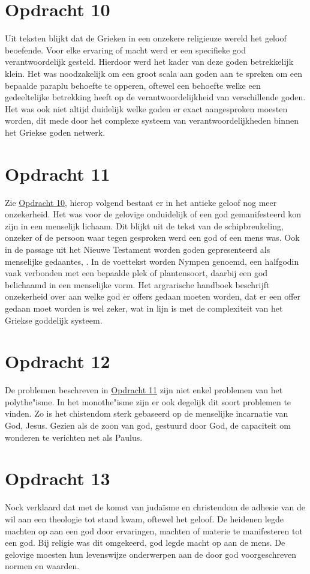 \documentclass[10pt]{amsart}
\begin{document}
\section*{Opdracht 10}
\label{opdracht10}
Uit teksten blijkt dat de Grieken in een onzekere religieuze wereld het geloof beoefende. Voor elke ervaring of macht werd er een specifieke god verantwoordelijk gesteld. Hierdoor werd het kader van deze goden betrekkelijk klein. Het was noodzakelijk om een groot scala aan goden aan te spreken om een bepaalde paraplu behoefte te opperen, oftewel een behoefte welke een gedeeltelijke betrekking heeft op de verantwoordelijkheid van verschillende goden. Het was ook niet altijd duidelijk welke goden er exact aangesproken moesten worden, dit mede door het complexe systeem van verantwoordelijkheden binnen het Griekse goden netwerk.

\section*{Opdracht 11}
\label{opdracht11}
Zie \hyperref[opdracht10]{Opdracht 10}, hierop volgend bestaat er in het antieke geloof nog meer onzekerheid. Het was voor de gelovige onduidelijk of een god gemanifesteerd kon zijn in een menselijk lichaam. Dit blijkt uit de tekst van de schipbreukeling, onzeker of de persoon waar tegen gesproken werd een god of een mens was. Ook in de passage uit het Nieuwe Testament worden goden gepresenteerd als menselijke gedaantes, . In de voettekst worden Nympen genoemd, een halfgodin vaak verbonden met een bepaalde plek of plantensoort, daarbij een god belichaamd in een menselijke vorm. Het argrarische handboek beschrijft onzekerheid over aan welke god er offers gedaan moeten worden, dat er een offer gedaan moet worden is wel zeker, wat in lijn is met de complexiteit van het Griekse goddelijk systeem.

\section*{Opdracht 12}
De problemen beschreven in \hyperref[opdracht11]{Opdracht 11} zijn niet enkel problemen van het polythe"isme. In het monothe"isme zijn er ook degelijk dit soort problemen te vinden. Zo is het chistendom sterk gebaseerd op de menselijke incarnatie van God, Jesus. Gezien als de zoon van god, gestuurd door God, de capaciteit om wonderen te verichten net als Paulus.

\section*{Opdracht 13}
Nock verklaard dat met de komst van judaïsme en christendom de adhesie van de wil aan een theologie tot stand kwam, oftewel het geloof.\autocite{nockConversionOldNew1933} De heidenen legde machten op aan een god door ervaringen, machten of materie te manifesteren tot een god. Bij religie was dit omgekeerd, god legde macht op aan de mens. De gelovige moesten hun levenswijze onderwerpen aan de door god voorgeschreven normen en waarden.
\end{document}
